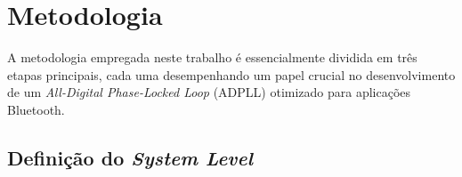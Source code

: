 \chapter{Metodologia}


%	
%	
%	
%	
%
%
%
%
%
%
%

A metodologia empregada neste trabalho é essencialmente dividida em três etapas principais, cada uma desempenhando um papel crucial no desenvolvimento de um \textit{All-Digital Phase-Locked Loop} (ADPLL) otimizado para aplicações Bluetooth. 

\section{Definição do \textit{System Level}}

